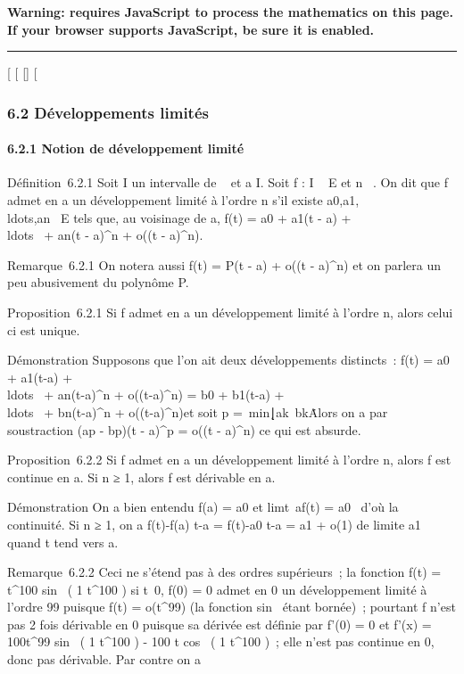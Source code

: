 \textbf{Warning: 
requires JavaScript to process the mathematics on this page.\\ If your
browser supports JavaScript, be sure it is enabled.}

\begin{center}\rule{3in}{0.4pt}\end{center}

{[}
{[}
{[}{]}
{[}

\subsubsection{6.2 Développements limités}

\paragraph{6.2.1 Notion de développement limité}

Définition~6.2.1 Soit I un intervalle de ~ et a \in I. Soit f : I \rightarrow~ E et n
\in {}~. On dit que f admet en a un développement limité à l'ordre n s'il
existe
a0,a1,\\ldots,an~
\in E tels que, au voisinage de a, f(t) = a0 + a1(t -
a) + \\ldots~ +
an(t - a)^n + o((t - a)^n).

Remarque~6.2.1 On notera aussi f(t) = P(t - a) + o((t - a)^n)
et on parlera un peu abusivement du polynôme P.

Proposition~6.2.1 Si f admet en a un développement limité à l'ordre n,
alors celui ci est unique.

Démonstration Supposons que l'on ait deux développements distincts~:
f(t) = a0 + a1(t-a) +
\\ldots~ +
an(t-a)^n + o((t-a)^n) = b0 +
b1(t-a) +
\\ldots~ +
bn(t-a)^n + o((t-a)^n)et soit p
=\
min\k∣ak\mathrel\neq~bk\.
Alors on a par soustraction (ap - bp)(t -
a)^p = o((t - a)^n) ce qui est absurde.

Proposition~6.2.2 Si f admet en a un développement limité à l'ordre n,
alors f est continue en a. Si n ≥ 1, alors f est dérivable en a.

Démonstration On a bien entendu f(a) = a0 et
limt\rightarrow~af(t) = a0~ d'où la
continuité. Si n ≥ 1, on a  f(t)-f(a) \over t-a =
f(t)-a0 \over t-a = a1 + o(1) de
limite a1 quand t tend vers a.

Remarque~6.2.2 Ceci ne s'étend pas à des ordres supérieurs~; la fonction
f(t) = t^100 sin~ ( 1
\over t^100 ) si
t\neq~0, f(0) = 0 admet en 0 un développement
limité à l'ordre 99 puisque f(t) = o(t^99) (la fonction
sin~ étant bornée)~; pourtant f n'est pas 2
fois dérivable en 0 puisque sa dérivée est définie par f'(0) = 0 et
f'(x) = 100t^99 sin~ ( 1
\over t^100 ) - 100 \over
t  cos~ ( 1 \over
t^100 )~; elle n'est pas continue en 0, donc pas dérivable.
Par contre on a

